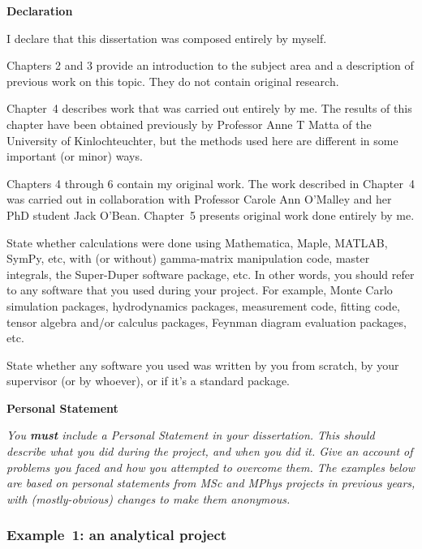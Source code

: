 \documentclass[12pt,a4paper]{report}
\begin{document}

\begin{center}
\textbf{Declaration}
\end{center}

I declare that this dissertation was composed entirely by myself.

Chapters 2 and 3 provide an introduction to the subject area and a
description of previous work on this topic. They do not contain
original research.

Chapter~4 describes work that was carried out entirely by me. The results of
this chapter have been obtained previously by Professor Anne T Matta of the
University of Kinlochteuchter, but the methods used here are different
in some important (or minor) ways.

Chapters 4 through 6 contain my original work. The work described in
Chapter~4 was carried out in collaboration with Professor Carole Ann O'Malley
and her PhD student Jack O'Bean. Chapter~5 presents original work done
entirely by me.

\bigskip

State whether calculations were done using Mathematica, Maple, MATLAB,
SymPy, etc, with (or without) gamma-matrix manipulation code, master
integrals, the Super-Duper software package, etc. In other words, you
should refer to any software that you used during your project. For
example, Monte Carlo simulation packages, hydrodynamics packages,
measurement code, fitting code, tensor algebra and/or calculus packages,
Feynman diagram evaluation packages, etc.

State whether any software you used was written by you from scratch,
by your supervisor (or by whoever), or if it's a standard package.

\newpage

\begin{center}
\textbf{Personal Statement}
\end{center}

\emph{You \textbf{\emph{must}} include a Personal Statement in your
  dissertation. This should describe what you did during the project,
  and when you did it. Give an account of problems you faced and how
  you attempted to overcome them. The examples below are based on
  personal statements from MSc and MPhys projects in previous years,
  with (mostly-obvious) changes to make them anonymous. }

\subsubsection*{Example~1: an analytical project}
\end{document}
